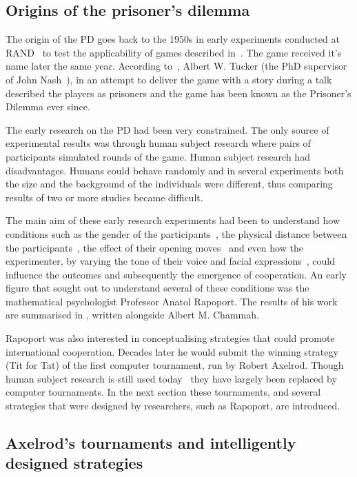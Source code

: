 \documentclass{article}
\theoremstyle{definition}
\begin{document}
\subsection{Origins of the prisoner's dilemma}\label{section:origin}

The origin of the PD goes back to the 1950s in early experiments conducted at
RAND~\cite{Flood1958} to test the applicability of games described
in~\cite{VonNeumann1944}. The game received it's name later the same year.
According to~\cite{Tucker1983}, Albert W. Tucker (the PhD supervisor of John
Nash~\cite{Nash1951}), in an attempt to deliver the game with a story during a
talk described the players as prisoners and the game has been known as the
Prisoner's Dilemma ever since.

The early research on the PD had been very constrained. The only source of
experimental results was through human subject research where pairs of
participants simulated rounds of the game. Human subject research had
disadvantages. Humans could behave randomly and in several experiments both the
size and the background of the individuals were different, thus comparing
results of two or more studies became difficult.

The main aim of these early research experiments had been to understand how
conditions such as the gender of the participants~\cite{Evans1966, Lutzker1961,
Mack1971}, the physical distance between the participants~\cite{Sensenig1972}, the
effect of their opening moves~\cite{Tedeschi1968} and even how the experimenter, by varying
the tone of their voice and facial expressions~\cite{Gallo1968}, could influence
the outcomes and subsequently the emergence of cooperation. An early figure that
sought out to understand several of these conditions was the mathematical
psychologist Professor Anatol Rapoport. The results of his work are summarised
in \cite{rapoport1965}, written alongside Albert M. Chammah.

Rapoport was also interested in conceptualising strategies that could promote
international cooperation. Decades later he would submit the winning strategy
(Tit for Tat) of the first computer tournament, run by Robert Axelrod. Though
human subject research is still used today~\cite{Testori2019} they have largely
been replaced by computer tournaments. In the next section these tournaments,
and several strategies that were designed by researchers, such as Rapoport, are
introduced.

\subsection{Axelrod's tournaments and intelligently designed strategies}
\label{subsection:intelligent_design}
\end{document}
